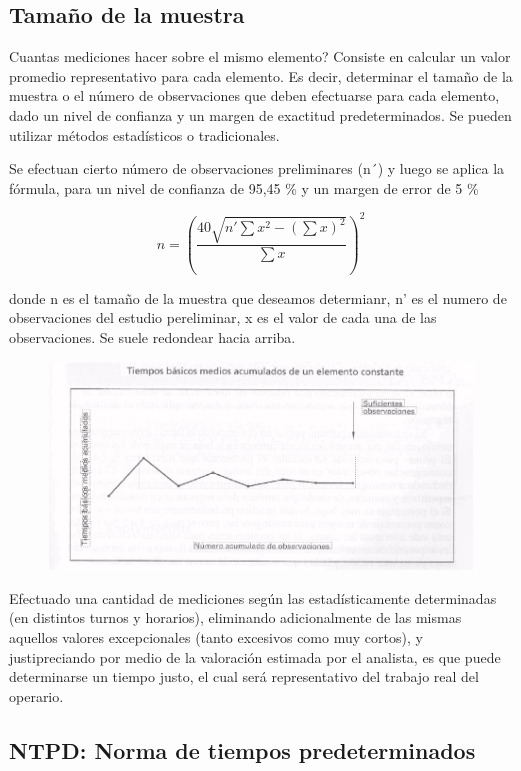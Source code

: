 \documentclass[a4paper,oneside,11pt]{article}
\begin{document}
\subsection{Tamaño de la muestra}

Cuantas mediciones hacer sobre el mismo elemento? Consiste en calcular un valor promedio representativo para cada elemento. Es decir, determinar el tamaño de la muestra o el número de observaciones que deben efectuarse para cada elemento, dado un nivel de confianza y un margen de exactitud predeterminados. Se pueden utilizar métodos estadísticos o tradicionales.

Se efectuan cierto número de observaciones preliminares (n´) y luego se aplica la fórmula, para un nivel de confianza de 95,45 \% y un margen de error de 5 \%

\begin{equation*}
    n = (\dfrac{40 \sqrt{n' \sum x^{2} - (\sum x)^2}}{\sum x})^2
\end{equation*}

donde n es el tamaño de la muestra que deseamos determianr, n' es el numero de observaciones del estudio pereliminar, x es el valor de cada una de las observaciones. Se suele redondear hacia arriba.

\begin{figure}
    \centering
    \includegraphics[scale=.5]{convergenica.png}
\end{figure}

Efectuado una cantidad de mediciones según las estadísticamente determinadas (en distintos turnos y horarios), eliminando adicionalmente de las mismas aquellos valores excepcionales (tanto excesivos como muy cortos), y justipreciando por medio de la valoración estimada por el analista, es que puede determinarse un tiempo justo, el cual será representativo del trabajo real del operario.

\subsection{NTPD: Norma de tiempos predeterminados}
\end{document}
